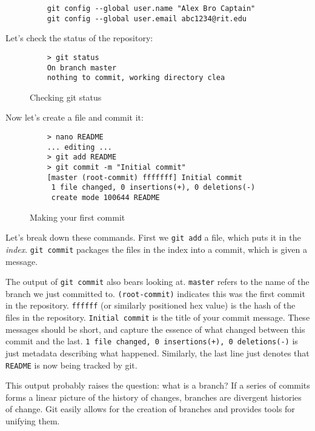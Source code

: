 \documentclass[11pt]{report}
\begin{document}
\begin{figure}[H]
  \begin{lstlisting}
    git config --global user.name "Alex Bro Captain"
    git config --global user.email abc1234@rit.edu
  \end{lstlisting}
\end{figure}

Let's check the status of the repository:
\begin{figure}[H]
  \caption{Checking git status}
  \begin{lstlisting}
    > git status
    On branch master
    nothing to commit, working directory clea
  \end{lstlisting}
\end{figure}

Now let's create a file and commit it:

\begin{figure}[H]
  \caption{Making your first commit}
  \begin{lstlisting}
    > nano README
    ... editing ...
    > git add README
    > git commit -m "Initial commit"
    [master (root-commit) fffffff] Initial commit
     1 file changed, 0 insertions(+), 0 deletions(-)
     create mode 100644 README
  \end{lstlisting}
\end{figure}

Let's break down these commands. First we \texttt{git add} a file,
which puts it in the \emph{index}. \texttt{git commit} packages the
files in the index into a commit, which is given a message.

The output of \texttt{git commit} also bears looking
at. \texttt{master} refers to the name of the branch we just committed
to. \texttt{(root-commit)} indicates this was the first commit in the
repository. \texttt{ffffff} (or similarly positioned hex value) is the
hash of the files in the repository. \texttt{Initial commit} is the
title of your commit message. These messages should be short, and
capture the essence of what changed between this commit and the
last. \texttt{1 file changed, 0 insertions(+), 0 deletions(-)} is just
metadata describing what happened. Similarly, the last line just
denotes that \texttt{README} is now being tracked by git.

This output probably raises the question: what is a branch?  If a
series of commits forms a linear picture of the history of changes,
branches are divergent histories of change. Git easily allows for the
creation of branches and provides tools for unifying them.
\end{document}
